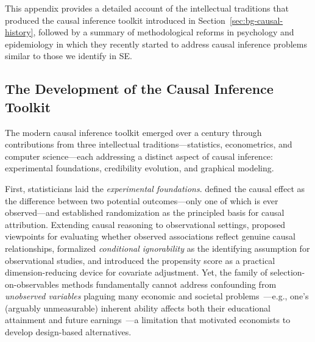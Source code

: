 This appendix provides a detailed account of the intellectual traditions that produced the causal inference toolkit introduced in Section~\ref{sec:bg-causal-history}, followed by a summary of methodological reforms in psychology and epidemiology in which they recently started to address causal inference problems similar to those we identify in SE\@.

\subsection{The Development of the Causal Inference Toolkit}
\label{sec:appendix-toolkit-history}

The modern causal inference toolkit emerged over a century through contributions from three intellectual traditions---statistics, econometrics, and computer science---each addressing a distinct aspect of causal inference: experimental foundations, credibility evolution, and graphical modeling.

First, statisticians laid the \emph{experimental foundations}.
\citet{neyman1923application} defined the causal effect as the difference between two potential outcomes---only one of which is ever observed---and \citet{fisher1935design} established randomization as the principled basis for causal attribution.
Extending causal reasoning to observational settings, \citet{hill1965environment} proposed viewpoints for evaluating whether observed associations reflect genuine causal relationships, \citet{rubin1974estimating} formalized \emph{conditional ignorability} as the identifying assumption for observational studies, and \citet{rosenbaum1983central} introduced the propensity score as a practical dimension-reducing device for covariate adjustment.
Yet, the family of selection-on-observables methods fundamentally cannot address confounding from \emph{unobserved variables} plaguing many economic and societal problems~\cite{heckman1979sample}---e.g., one's (arguably unmeasurable) inherent ability affects both their educational attainment and future earnings~\cite{card1999causal}---a limitation that motivated economists to develop design-based alternatives.

